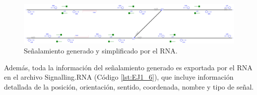 	\begin{figure}[H]
		\centering
		\includegraphics[width=1\textwidth]{resultados-obtenidos/ejemplo8/images/8_RNA.png}
		\centering\caption{Señalamiento generado y simplificado por el RNA.}
		\label{fig:EJ8_7}
	\end{figure}
	
	Además, toda la información del señalamiento generado es exportada por el RNA en el archivo Signalling.RNA (Código \ref{lst:EJ1_6}), que incluye información detallada de la posición, orientación, sentido, coordenada, nombre y tipo de señal.
	
